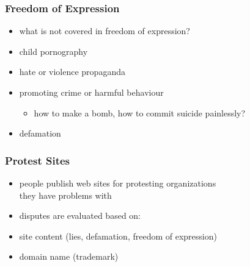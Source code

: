 \documentclass[dvipsnames]{beamer}
\theoremstyle{plain}
\begin{document}
\begin{frame}
  \frametitle{Freedom of Expression}

  \begin{itemize}
    \item what is not covered in freedom of expression?

    \bigskip
    \item child pornography
    \item hate or violence propaganda
    \item promoting crime or harmful behaviour
    \begin{itemize}
      \item how to make a bomb, how to commit suicide painlessly?
    \end{itemize}
    \item defamation
  \end{itemize}
\end{frame}

\begin{frame}
  \frametitle{Protest Sites}

  \begin{itemize}
    \item people publish web sites for protesting organizations\\
      they have problems with

    \bigskip
    \item disputes are evaluated based on:
    \smallskip
    \item site content (lies, defamation, freedom of expression)
    \item domain name (trademark)
  \end{itemize}
\end{frame}
\end{document}

